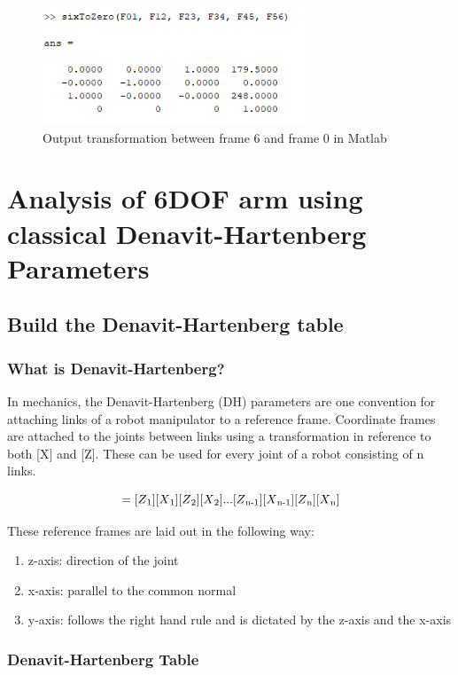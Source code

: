\documentclass [11pt]{report}
\begin{document}
\begin{figure}[H]
\centerline{\includegraphics[width=8cm]{sixToZeroOutput.png}}
\caption{Output transformation between frame 6 and frame 0 in Matlab}
\label{fig}
\end{figure}

\chapter{Analysis of 6DOF arm using classical Denavit-Hartenberg Parameters}

\section{Build the Denavit-Hartenberg table}
\subsection{What is Denavit-Hartenberg?}

In mechanics, the Denavit-Hartenberg (DH) parameters are one convention for attaching links of a robot manipulator to a reference frame. Coordinate frames are attached to the joints between links using a transformation in reference to both [X] and [Z]. These can be used for every joint of a robot consisting of n links. 

\begin{equation*}
[T] = [Z\textsubscript{1}][X\textsubscript{1}][Z\textsubscript{2}][X\textsubscript{2}]...[Z\textsubscript{n-1}][X\textsubscript{n-1}][Z\textsubscript{n}][X\textsubscript{n}]
\end{equation*}

These reference frames are laid out in the following way:
\begin{enumerate}
\item z-axis: direction of the joint
\item x-axis: parallel to the common normal
\item y-axis: follows the right hand rule and is dictated by the z-axis and the x-axis
\end{enumerate}

\subsection{Denavit-Hartenberg Table}
\end{document}
